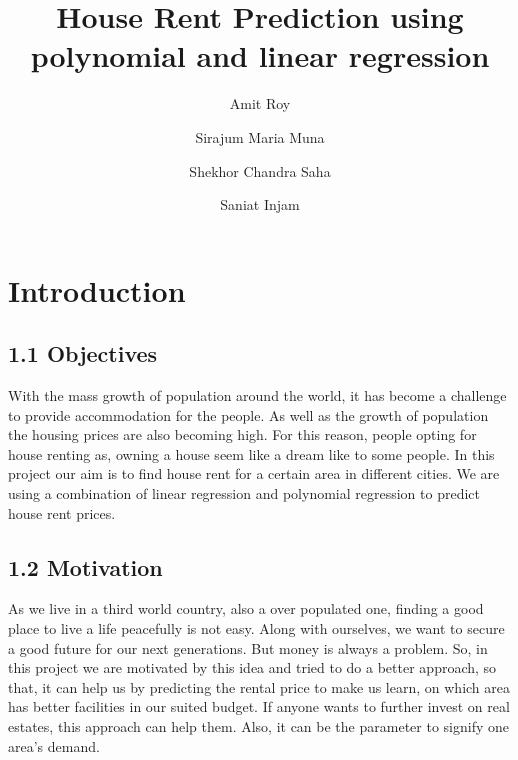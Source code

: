 \documentclass[conference]{IEEEtran}[10]
\begin{document}
\title{House Rent Prediction using polynomial and linear regression}
\author[1]{ Amit Roy
}

\author[2]{ Sirajum Maria Muna
}

\author[3]{ Shekhor Chandra Saha
}

\author[4]{ Saniat Injam
}






\maketitle
\IEEEpubidadjcol
\section{Introduction}
\subsection{1.1 Objectives}
With the mass growth of population around the world, it has become a challenge to provide accommodation for the people. As well as the growth of population the housing prices are also becoming high. For this reason, people opting for house renting as, owning a house seem like a dream like to some people. In this project our aim is to find house rent for a certain area in different cities. We are using a combination of linear regression and polynomial regression to predict house rent prices. 
\subsection{1.2 Motivation}
As we live in a third world country, also a over populated one, finding a good place to live a life peacefully is not easy. Along with ourselves, we want to secure a good future for our next generations. But money is always a problem. So, in this project we are motivated by this idea and tried to do a better approach, so that, it can help us by predicting the rental price to make us learn, on which area has better facilities in our suited budget. If anyone wants to further invest on real estates, this approach can help them. Also, it can be the parameter to signify one area’s demand.
\end{document}
